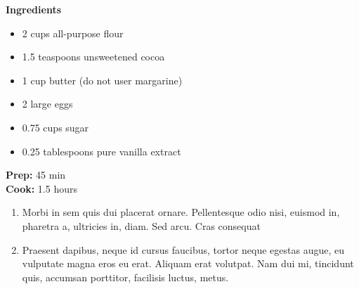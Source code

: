 \documentclass[a4paper]{article}
\newcommand{\ingredient}[1]{
  \item[]{#1}\\
}
\newcommand{\prep}[1]{
  \textbf{Prep:} {#1}\\
}
\newcommand{\cooking}[1]{
  \textbf{Cook:} {#1}\\
}
\newenvironment{steps}
{%
  \begin{enumerate}[leftmargin=0.3cm]
}
{%
  \end{enumerate}
}
\newenvironment{ingredients}
{%
  \vspace{9pt}
  \begin{itemize}[nosep, itemsep=2pt, leftmargin=3pt]
}
{%
  \end{itemize}
}
\begin{document}
\begin{multicols}{3}
  \normalsize
  \raggedright
  \textbf{Ingredients}\\
  \begin{ingredients}
      \ingredient{2 cups all-purpose flour}
      \ingredient{1.5 teaspoons unsweetened cocoa}
      \ingredient{1 cup butter (do not user margarine)}
      \ingredient{2 large eggs}
      \ingredient{0.75 cups sugar}
      \ingredient{0.25 tablespoons pure vanilla extract}
  \end{ingredients}
    \vspace{0.5cm}
    \prep{45 min} %
    \cooking{1.5 hours} %
    \vspace{0pt}
  \columnbreak
  \begin{steps}
    \item{Morbi in sem quis dui placerat ornare. Pellentesque odio nisi, euismod in, pharetra a, ultricies in, diam. Sed arcu. Cras consequat} %
    \item{Praesent dapibus, neque id cursus faucibus, tortor neque egestas augue, eu vulputate magna eros eu erat. Aliquam erat volutpat. Nam dui mi, tincidunt quis, accumsan porttitor, facilisis luctus, metus.} %

\end{steps}
\end{multicols}
\end{document}
